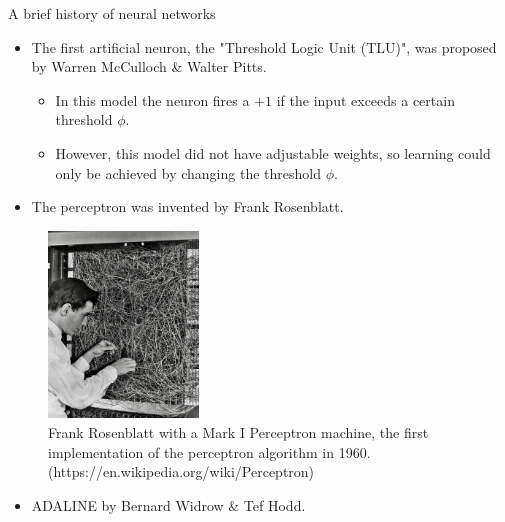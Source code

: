 











\begin{vbframe}{A brief history of neural networks}
  
  \begin{itemize}
    \item {} The first artificial neuron, the "Threshold Logic Unit (TLU)", was proposed by Warren McCulloch \& Walter Pitts.
    \begin{itemize}
      \item In this model the neuron fires a $+1$ if the input exceeds a certain threshold $\phi$.
      \item However, this model did not have adjustable weights, so learning could only be achieved by changing the threshold $\phi$.
    \end{itemize}
  \end{itemize}
\framebreak
  \begin{itemize}
    \item {} The perceptron was invented by Frank Rosenblatt. 
  \end{itemize}
    \begin{figure}
        \includegraphics[width=4cm]{plots/Walter.jpg}
        \caption{Frank Rosenblatt with a Mark I Perceptron machine, the first implementation of the perceptron algorithm in 1960. (https://en.wikipedia.org/wiki/Perceptron)}
    \end{figure}
\framebreak
  \begin{itemize}
    \item {} ADALINE by Bernard Widrow \& Tef Hodd.

\end{itemize}
\end{vbframe}
